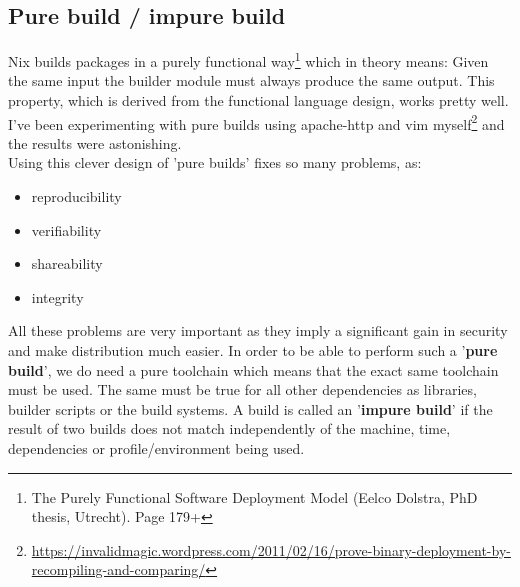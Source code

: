 \documentclass[a4paper,10pt]{article}
\begin{document}
\subsection{Pure build / impure build}
\label{purebuild}
Nix builds packages in a purely functional way\footnote{The Purely Functional Software Deployment Model (Eelco Dolstra, PhD thesis, Utrecht). Page 179+} which in theory means: Given the same input the builder module must always produce the same output. This property, which is derived from the functional language design, works pretty well. I've been experimenting with pure builds using apache-http and vim myself\footnote{\url{https://invalidmagic.wordpress.com/2011/02/16/prove-binary-deployment-by-recompiling-and-comparing/}} and the results were astonishing. \\

Using this clever design of 'pure builds' fixes so many problems, as:
\begin{itemize}
\item reproducibility 
\item verifiability
\item shareability
\item integrity
\end{itemize}
All these problems are very important as they imply a significant gain in security and make distribution much easier. In order to be able to perform such a '\textbf{pure build}', we do need a pure toolchain which means that the exact same toolchain must be used. The same must be true for all other dependencies as libraries, builder scripts or the build systems. A build is called an '\textbf{impure build}' if the result of two builds does not match independently of the machine, time, dependencies or profile/environment being used.\\
\end{document}

